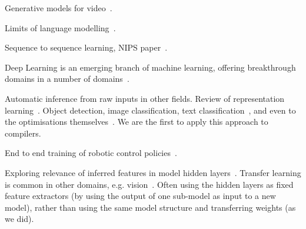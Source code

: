 Generative models for video~\cite{Srivastava2015}.

Limits of language modelling~\cite{Jozefowicz2016a}.

Sequence to sequence learning, NIPS paper~\cite{Sutskever2014}.

Deep Learning is an emerging branch of machine learning, offering breakthrough domains in a number of domains~\cite{Wang2017}.

Automatic inference from raw inputs in other fields. Review of representation learning~\cite{Bengio2013}. Object detection, image classification, text classification~\cite{Conneau2016}, and even to the optimisations themselves~\cite{Andrychowicz2016a}. We are the first to apply this approach to compilers.

End to end training of robotic control policies~\cite{Levine2016}.




Exploring relevance of inferred features in model hidden layers~\cite{Yosinski2014}. Transfer learning is common in other domains, e.g. vision~\cite{Razavian2014,Oquab2014}. Often using the hidden layers as fixed feature extractors (by using the output of one sub-model as input to a new model), rather than using the same model structure and transferring weights (as we did).



